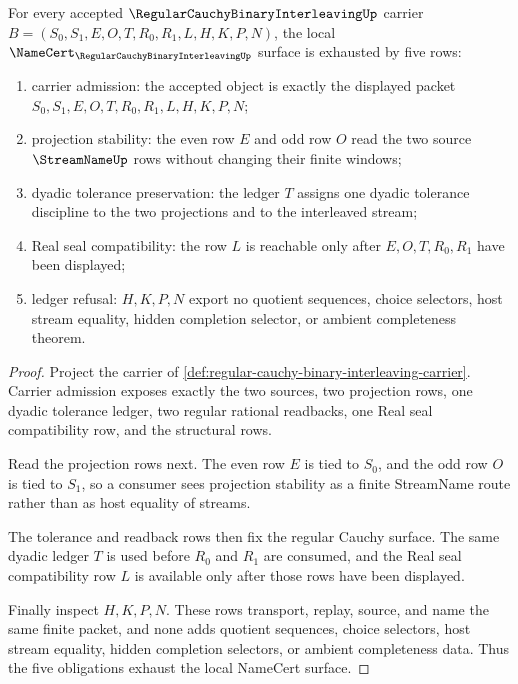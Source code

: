\begin{theorem}
\label{thm:regular-cauchy-binary-interleaving-namecert-obligations}
For every accepted $\RegularCauchyBinaryInterleavingUp$ carrier $B=(S_0,S_1,E,O,T,R_0,R_1,L,H,K,P,N)$, the local $\NameCert_{\RegularCauchyBinaryInterleavingUp}$ surface is exhausted by five rows:
\begin{enumerate}
\item carrier admission: the accepted object is exactly the displayed packet $S_0,S_1,E,O,T,R_0,R_1,L,H,K,P,N$;
\item projection stability: the even row $E$ and odd row $O$ read the two source $\StreamNameUp$ rows without changing their finite windows;
\item dyadic tolerance preservation: the ledger $T$ assigns one dyadic tolerance discipline to the two projections and to the interleaved stream;
\item Real seal compatibility: the row $L$ is reachable only after $E,O,T,R_0,R_1$ have been displayed;
\item ledger refusal: $H,K,P,N$ export no quotient sequences, choice selectors, host stream equality, hidden completion selector, or ambient completeness theorem.
\end{enumerate}
\end{theorem}
\begin{proof}
Project the carrier of \autoref{def:regular-cauchy-binary-interleaving-carrier}. Carrier admission exposes exactly the two sources, two projection rows, one dyadic tolerance ledger, two regular rational readbacks, one Real seal compatibility row, and the structural rows.

Read the projection rows next. The even row $E$ is tied to $S_0$, and the odd row $O$ is tied to $S_1$, so a consumer sees projection stability as a finite StreamName route rather than as host equality of streams.

The tolerance and readback rows then fix the regular Cauchy surface. The same dyadic ledger $T$ is used before $R_0$ and $R_1$ are consumed, and the Real seal compatibility row $L$ is available only after those rows have been displayed.

Finally inspect $H,K,P,N$. These rows transport, replay, source, and name the same finite packet, and none adds quotient sequences, choice selectors, host stream equality, hidden completion selectors, or ambient completeness data. Thus the five obligations exhaust the local NameCert surface.
\end{proof}

